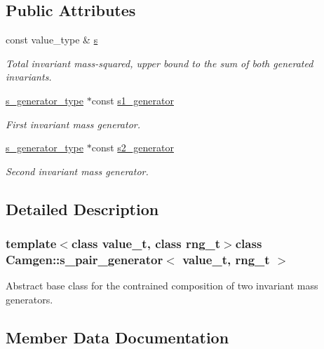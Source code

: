 \subsection*{Public Attributes}
\begin{DoxyCompactItemize}
\item 
const value\+\_\+type \& \hyperlink{a00495_adbd0b9bca10903e6ab2d660d8646a526}{s}
\begin{DoxyCompactList}\small\item\em Total invariant mass-\/squared, upper bound to the sum of both generated invariants. \end{DoxyCompactList}\item 
\hypertarget{a00495_a91e15c9148cb4167038ca03af9b2a1c2}{}\hyperlink{a00577}{s\+\_\+generator\+\_\+type} $\ast$const \hyperlink{a00495_a91e15c9148cb4167038ca03af9b2a1c2}{s1\+\_\+generator}\label{a00495_a91e15c9148cb4167038ca03af9b2a1c2}

\begin{DoxyCompactList}\small\item\em First invariant mass generator. \end{DoxyCompactList}\item 
\hypertarget{a00495_a4c831f09b3f4aa647b509e142ccde1ac}{}\hyperlink{a00577}{s\+\_\+generator\+\_\+type} $\ast$const \hyperlink{a00495_a4c831f09b3f4aa647b509e142ccde1ac}{s2\+\_\+generator}\label{a00495_a4c831f09b3f4aa647b509e142ccde1ac}

\begin{DoxyCompactList}\small\item\em Second invariant mass generator. \end{DoxyCompactList}\end{DoxyCompactItemize}


\subsection{Detailed Description}
\subsubsection*{template$<$class value\+\_\+t, class rng\+\_\+t$>$class Camgen\+::s\+\_\+pair\+\_\+generator$<$ value\+\_\+t, rng\+\_\+t $>$}

Abstract base class for the contrained composition of two invariant mass generators. 

\subsection{Member Data Documentation}
\hypertarget{a00495_adbd0b9bca10903e6ab2d660d8646a526}{}
